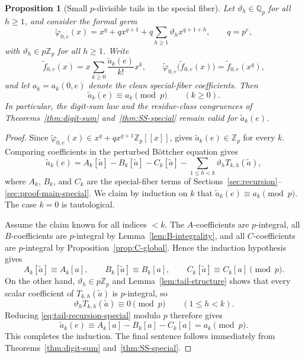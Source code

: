 \documentclass[11pt]{amsart}
\numberwithin{equation}{section}
\newtheorem{proposition}[proposition]{Proposition}
\newcommand{\Qp}{\mathbb{Q}_p}
\newcommand{\Zp}{\mathbb{Z}_p}
\begin{document}
\begin{proposition}[Small $p$-divisible tails in the special fiber]\label{prop:small-tail-special}
Let $\vartheta_h\in\Qp$ for all $h\ge1$, and consider the formal germ
\[
        \widetilde\varphi_{0,e}(x)=x^q+qx^{q+1}+q\sum_{h\ge1}\vartheta_h x^{q+1+h},
        \qquad q=p^e,
\]
with $\vartheta_h\in p\Zp$ for all $h\ge1$.  Write
\[
        \widetilde f_{0,e}(x)=x\sum_{k\ge0}\frac{\widetilde a_k(e)}{k!}x^k,
        \qquad
        \widetilde\varphi_{0,e}\bigl(\widetilde f_{0,e}(x)\bigr)=\widetilde f_{0,e}(x^q),
\]
and let $a_k=a_k(0,e)$ denote the clean special-fiber coefficients.  Then
\[
        \widetilde a_k(e)\equiv a_k\pmod p
        \qquad(k\ge0).
\]
In particular, the digit-sum law and the residue-class congruences of Theorems~\ref{thm:digit-sum} and~\ref{thm:SS-special} remain valid for $\widetilde a_k(e)$.
\end{proposition}
\begin{proof}
Since $\widetilde\varphi_{0,e}(x)\in x^q+qx^{q+1}\Zp[\![x]\!]$, \cite[Theorem~3(b)]{SalernoSilverman} gives $\widetilde a_k(e)\in\Zp$ for every $k$.  Comparing coefficients in the perturbed B\"ottcher equation gives
\begin{equation}\label{eq:tail-recursion-special}
        \widetilde a_k(e)=A_k[\widetilde a]-B_k[\widetilde a]-C_k[\widetilde a]-\sum_{1\le h<k}\vartheta_hT_{k,h}(\widetilde a),
\end{equation}
where $A_k$, $B_k$, and $C_k$ are the special-fiber terms of Sections~\ref{sec:recursion}--\ref{sec:proof-main-special}.  We claim by induction on $k$ that $\widetilde a_k(e)\equiv a_k\pmod p$.  The case $k=0$ is tautological.

Assume the claim known for all indices $<k$.  The $A$-coefficients are $p$-integral, all $B$-coefficients are $p$-integral by Lemma~\ref{lem:B-integrality}, and all $C$-coefficients are $p$-integral by Proposition~\ref{prop:C-global}.  Hence the induction hypothesis gives
\[
        A_k[\widetilde a]\equiv A_k[a],
        \qquad
        B_k[\widetilde a]\equiv B_k[a],
        \qquad
        C_k[\widetilde a]\equiv C_k[a]
        \pmod p.
\]
On the other hand, $\vartheta_h\in p\Zp$ and Lemma~\ref{lem:tail-structure} shows that every scalar coefficient of $T_{k,h}(\widetilde a)$ is $p$-integral, so
\[
        \vartheta_hT_{k,h}(\widetilde a)\equiv0\pmod p
        \qquad(1\le h<k).
\]
Reducing \eqref{eq:tail-recursion-special} modulo $p$ therefore gives
\[
        \widetilde a_k(e)\equiv A_k[a]-B_k[a]-C_k[a]=a_k\pmod p.
\]
This completes the induction.  The final sentence follows immediately from Theorems~\ref{thm:digit-sum} and~\ref{thm:SS-special}.
\end{proof}
\end{document}
